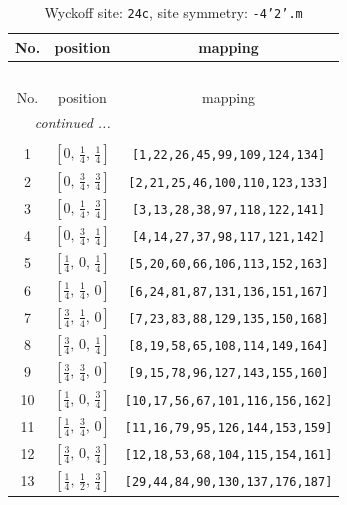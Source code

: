 \documentclass[fleqn,8pt]{jsarticle}
\begin{document}
\begin{longtable}{ccc}
\caption{Wyckoff site: {\tt 24c}, site symmetry: {\tt -4'2'.m}}
 \\
 \hline \hline
No. & position & mapping \\ \hline \endfirsthead

\multicolumn{2}{l}{\tablename\ \thetable{}} \\
 \hline \hline
No. & position & mapping \\ \hline \endhead

 \hline \hline
\multicolumn{2}{r}{\footnotesize\it continued ...} \\ \endfoot

 \hline \hline
\multicolumn{2}{r}{} \\ \endlastfoot

1 & $\left[ 0,\, \frac{1}{4},\, \frac{1}{4} \right]$ & {\tt [1,22,26,45,99,109,124,134]} \\ \hline
2 & $\left[ 0,\, \frac{3}{4},\, \frac{3}{4} \right]$ & {\tt [2,21,25,46,100,110,123,133]} \\ \hline
3 & $\left[ 0,\, \frac{1}{4},\, \frac{3}{4} \right]$ & {\tt [3,13,28,38,97,118,122,141]} \\ \hline
4 & $\left[ 0,\, \frac{3}{4},\, \frac{1}{4} \right]$ & {\tt [4,14,27,37,98,117,121,142]} \\ \hline
5 & $\left[ \frac{1}{4},\, 0,\, \frac{1}{4} \right]$ & {\tt [5,20,60,66,106,113,152,163]} \\ \hline
6 & $\left[ \frac{1}{4},\, \frac{1}{4},\, 0 \right]$ & {\tt [6,24,81,87,131,136,151,167]} \\ \hline
7 & $\left[ \frac{3}{4},\, \frac{1}{4},\, 0 \right]$ & {\tt [7,23,83,88,129,135,150,168]} \\ \hline
8 & $\left[ \frac{3}{4},\, 0,\, \frac{1}{4} \right]$ & {\tt [8,19,58,65,108,114,149,164]} \\ \hline
9 & $\left[ \frac{3}{4},\, \frac{3}{4},\, 0 \right]$ & {\tt [9,15,78,96,127,143,155,160]} \\ \hline
10 & $\left[ \frac{1}{4},\, 0,\, \frac{3}{4} \right]$ & {\tt [10,17,56,67,101,116,156,162]} \\ \hline
11 & $\left[ \frac{1}{4},\, \frac{3}{4},\, 0 \right]$ & {\tt [11,16,79,95,126,144,153,159]} \\ \hline
12 & $\left[ \frac{3}{4},\, 0,\, \frac{3}{4} \right]$ & {\tt [12,18,53,68,104,115,154,161]} \\ \hline
13 & $\left[ \frac{1}{4},\, \frac{1}{2},\, \frac{3}{4} \right]$ & {\tt [29,44,84,90,130,137,176,187]} \\ \hline

\end{longtable}
\end{document}
